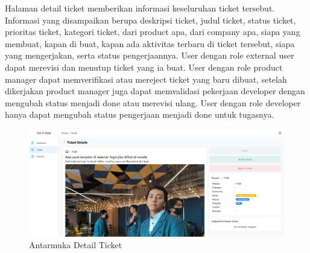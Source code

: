 \documentclass[12pt]{article}
\begin{document}
\begin{enumerate}[label=\textbf{5.\arabic*}]
\begin{enumerate}[label=\textbf{5.1\arabic*}]
\begin{enumerate}[label=\textbf{5.1.1\arabic*}]
            Halaman detail ticket memberikan informasi keseluruhan ticket tersebut. Informasi yang disampaikan berupa deskripsi ticket, judul ticket, status ticket, prioritas ticket, kategori ticket, dari product apa, dari company apa, siapa yang membuat, kapan di buat, kapan ada aktivitas terbaru di ticket tersebut, siapa yang mengerjakan, serta status pengerjaannya. User dengan role external user dapat merevisi dan menutup ticket yang ia buat. User dengan role product manager dapat memverifikasi atau mereject ticket yang baru dibuat, setelah dikerjakan product manager juga dapat memvalidasi pekerjaan developer dengan mengubah status menjadi done atau merevisi ulang. User dengan role developer hanya dapat mengubah status pengerjaan menjadi done untuk tugasnya. 

            \begin{figure}[H]
                \centering \includegraphics[width=\textwidth]{images/antarmuka/detail.png}
                \caption{Antarmuka Detail Ticket}
                \label{fig:antarmuka-detail}
            \end{figure}
    
        \end{enumerate}
    \end{enumerate}




\end{enumerate}

\newpage



\end{document}
